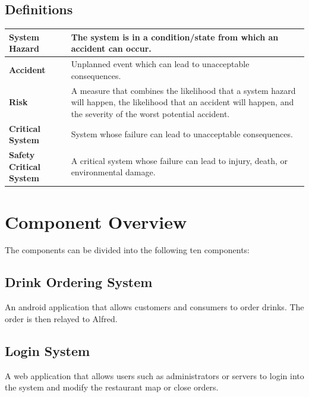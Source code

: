 \documentclass [10pt]{article}
\begin{document}
\subsection{Definitions}

\begin{longtable}{| p{} | p{} |}\hline
	\rowcolor{tableCell}\textbf{System Hazard} & The system is in a condition/state from which an accident can occur.\\ \hline
	\textbf{Accident} & Unplanned event which can lead to unacceptable consequences. \\ \hline
	\rowcolor{tableCell}\textbf{Risk} & A measure that combines the likelihood that a system hazard will happen, the likelihood that an accident will happen, and the severity of the worst potential accident.\\ \hline
	\textbf{Critical System} & System whose failure can lead to unacceptable consequences.\\ \hline
	\rowcolor{tableCell}\textbf{Safety Critical System} & A critical system whose failure can lead to injury, death, or environmental damage.\\ \hline
\end{longtable}


\section{Component Overview}
The components can be divided into the following ten components:

\subsection{Drink Ordering System}
An android application that allows customers and consumers to order drinks. The order is then relayed to Alfred.

\subsection{Login System}
A web application that allows users such as administrators or servers to login into the system and modify the restaurant map or close orders.
\end{document}
